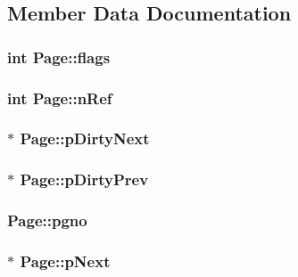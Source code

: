 \subsection{Member Data Documentation}
\hypertarget{struct_page_aa3e3b457d87c66b71e9b497bb44d5d43}{
\subsubsection[{flags}]{\setlength{\rightskip}{0pt plus 5cm}int Page\-::flags}}\label{df/d9b/struct_page_aa3e3b457d87c66b71e9b497bb44d5d43}
\hypertarget{struct_page_a000e1e83db5042ff7d574299f2b0b093}{
\subsubsection[{n\-Ref}]{\setlength{\rightskip}{0pt plus 5cm}int Page\-::n\-Ref}}\label{df/d9b/struct_page_a000e1e83db5042ff7d574299f2b0b093}
\hypertarget{struct_page_a2c5d338f00c7d03796278b256e86f873}{
\subsubsection[{p\-Dirty\-Next}]{$\ast$ Page\-::p\-Dirty\-Next}}\label{df/d9b/struct_page_a2c5d338f00c7d03796278b256e86f873}
\hypertarget{struct_page_a8446031d1392ff11e0f32bdd9f099111}{
\subsubsection[{p\-Dirty\-Prev}]{$\ast$ Page\-::p\-Dirty\-Prev}}\label{df/d9b/struct_page_a8446031d1392ff11e0f32bdd9f099111}
\hypertarget{struct_page_a98ebb8cf4e3f5ced9307e5d17a5a7fa9}{
\subsubsection[{pgno}]{ Page\-::pgno}}\label{df/d9b/struct_page_a98ebb8cf4e3f5ced9307e5d17a5a7fa9}
\hypertarget{struct_page_a9fc270c447b64cd3c9af9538f0820d34}{
\subsubsection[{p\-Next}]{$\ast$ Page\-::p\-Next}}\label{df/d9b/struct_page_a9fc270c447b64cd3c9af9538f0820d34}
